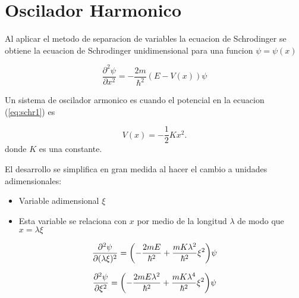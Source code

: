 \documentclass[11pt]{article}
\author{Rafael Corella, Carlos Felix, Bryan Campa}
\date{\today}
\begin{document}
\section{Oscilador Harmonico}
\label{sec:orgfbc7872}

Al aplicar el metodo de separacion de variables la ecuacion de Schrodinger se obtiene la ecuacion de Schrodinger unidimensional para una funcion \(\psi = \psi(x)\)

\begin{equation}
\label{eq:schr1}
\frac{\partial^{2}\psi}{\partial x^2} = - \frac{2m}{\hbar^2}(E - V(x))\psi
\end{equation}

Un sistema de oscilador armonico es cuando el potencial en la ecuacion (\ref{eq:schr1}) es

\[ V(x) = - \frac{1}{2}K x^2. \]
donde \(K\) es una constante.

El desarrollo se simplifica en gran medida al hacer el cambio a unidades adimensionales:

\begin{itemize}
\item Variable adimensional \(\xi\)
\item Esta variable se relaciona con \(x\) por medio de la longitud \(\lambda\) de modo que \(x = \lambda \xi\)
\end{itemize}

\[ \pdv[2]{\psi}{(\lambda \xi)} = \qty( - \frac{2m E }{\hbar^2} + \frac{mK \lambda^2}{\hbar^2} \xi^2  )\psi \]

\[ \pdv[2]{\psi}{\xi} = \qty( - \frac{2m E \lambda^{2}}{\hbar^2} + \frac{mK \lambda^4}{\hbar^2} \xi^2  )\psi \]
\end{document}
